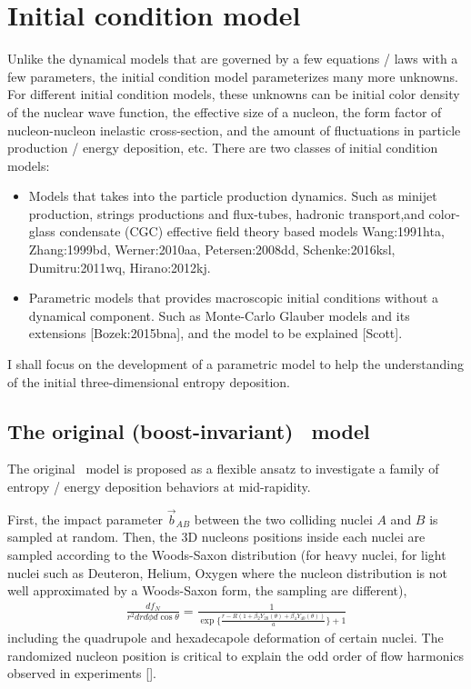 \section{Initial condition model}
Unlike the dynamical models that are governed by a few equations / laws with a few parameters, the initial condition model parameterizes many more unknowns.
For different initial condition models, these unknowns can be initial color density of the nuclear wave function, the effective size of a nucleon, the form factor of nucleon-nucleon inelastic cross-section, and the amount of fluctuations in particle production / energy deposition, etc.
There are two classes of initial condition models:
\begin{itemize}
\item Models that takes into the particle production dynamics. Such as minijet production, strings productions and flux-tubes, hadronic transport,and color-glass condensate (CGC) effective field theory based models {Wang:1991hta, Zhang:1999bd, Werner:2010aa, Petersen:2008dd, Schenke:2016ksl, Dumitru:2011wq, Hirano:2012kj}.
\item Parametric models that provides macroscopic initial conditions without a dynamical component. Such as Monte-Carlo Glauber models and its extensions [Bozek:2015bna], and the \trento model to be explained [Scott].
\end{itemize}
I shall focus on the development of a parametric model \trento to help the understanding of the initial three-dimensional entropy deposition.


\subsection{The original (boost-invariant) \trento\ model}
The original \trento\ model is proposed as a flexible ansatz to investigate a family of entropy / energy deposition behaviors at mid-rapidity.

First, the impact parameter $\vec{b}_{AB}$ between the two colliding nuclei $A$ and $B$ is sampled at random.
Then, the 3D nucleons positions inside each nuclei are sampled according to the Woods-Saxon distribution (for heavy nuclei, for light nuclei such as Deuteron, Helium, Oxygen where the nucleon distribution is not well approximated by a Woods-Saxon form, the sampling are different),
\begin{eqnarray}
\frac{df_N}{r^2 dr d\phi d\cos\theta} = \frac{1}{\exp\{\frac{r-R(1+\beta_2 Y_{20}(\theta)+\beta_4 Y_{40}(\theta))}{a}\}+1}
\end{eqnarray}
including the quadrupole and hexadecapole deformation of certain nuclei.
The randomized nucleon position is critical to explain the odd order of flow harmonics observed in experiments [].

